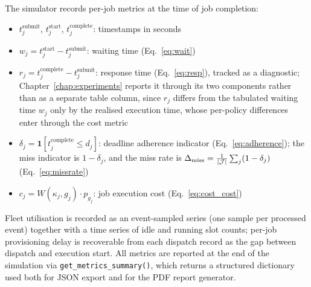 The simulator records per-job metrics at the time of job completion:
\begin{itemize}
  \item $t_j^{\text{submit}}$, $t_j^{\text{start}}$, $t_j^{\text{complete}}$: timestamps in seconds
  \item $w_j = t_j^{\text{start}} - t_j^{\text{submit}}$: waiting time (Eq.~\ref{eq:wait})
  \item $r_j = t_j^{\text{complete}} - t_j^{\text{submit}}$: response time (Eq.~\ref{eq:resp}), tracked as a diagnostic; Chapter~\ref{chap:experiments} reports it through its two components rather than as a separate table column, since $r_j$ differs from the tabulated waiting time $w_j$ only by the realised execution time, whose per-policy differences enter through the cost metric
  \item $\delta_j = \mathbf{1}[t_j^{\text{complete}} \leq d_j]$: deadline adherence indicator (Eq.~\ref{eq:adherence}); the miss indicator is $1 - \delta_j$, and the miss rate is $\Delta_{\text{miss}} = \frac{1}{|\mathcal{J}|}\sum_{j}(1-\delta_j)$ (Eq.~\ref{eq:missrate})
  \item $c_j = W(\kappa_j, g_j) \cdot p_{g_j}$: job execution cost (Eq.~\ref{eq:cost_cost})
\end{itemize}

Fleet utilisation is recorded as an event-sampled series (one sample per processed event) together with a time series of idle and running slot counts; per-job provisioning delay is recoverable from each dispatch record as the gap between dispatch and execution start. All metrics are reported at the end of the simulation via \texttt{get\_\allowbreak metrics\_\allowbreak summary()}, which returns a structured dictionary used both for JSON export and for the PDF report generator.

